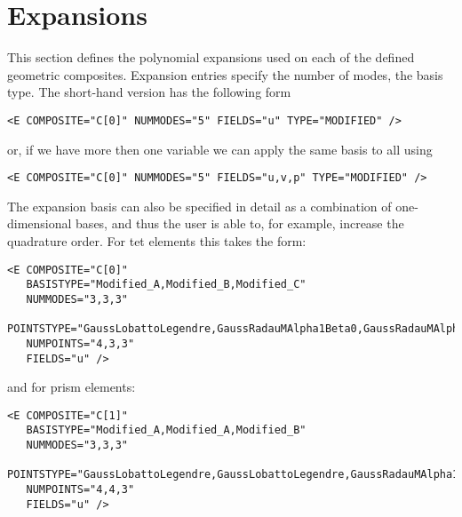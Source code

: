 \section{Expansions}
This section defines the polynomial expansions used on each of the defined
geometric composites. Expansion entries specify the number of modes, the basis
type. The short-hand version has the following form

\begin{lstlisting}[style=XMLStyle]
<E COMPOSITE="C[0]" NUMMODES="5" FIELDS="u" TYPE="MODIFIED" />
\end{lstlisting}

or, if we have more then one variable we can apply the same basis to all using

\begin{lstlisting}[style=XMLStyle]
<E COMPOSITE="C[0]" NUMMODES="5" FIELDS="u,v,p" TYPE="MODIFIED" />
\end{lstlisting}

The expansion basis can also be specified in detail as a combination of
one-dimensional bases, and thus the user is able to, for example, increase the
quadrature order. For tet elements this takes the form:

\begin{lstlisting}[style=XMLStyle]
<E COMPOSITE="C[0]" 
   BASISTYPE="Modified_A,Modified_B,Modified_C" 
   NUMMODES="3,3,3"
   POINTSTYPE="GaussLobattoLegendre,GaussRadauMAlpha1Beta0,GaussRadauMAlpha2Beta0"
   NUMPOINTS="4,3,3"
   FIELDS="u" />
\end{lstlisting}

and for prism elements:

\begin{lstlisting}[style=XMLStyle]
<E COMPOSITE="C[1]" 
   BASISTYPE="Modified_A,Modified_A,Modified_B" 
   NUMMODES="3,3,3"
   POINTSTYPE="GaussLobattoLegendre,GaussLobattoLegendre,GaussRadauMAlpha1Beta0"
   NUMPOINTS="4,4,3"
   FIELDS="u" />
\end{lstlisting}

